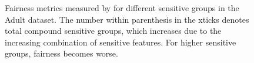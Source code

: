 \begin{figure}
	\centering
	\caption[Fairness verification on compound sensitive groups]{Fairness metrics measured by {\justicia} for different sensitive groups in the Adult dataset. The number within parenthesis in the xticks denotes total compound sensitive groups, which increases due to the increasing combination of sensitive features. For higher sensitive groups, fairness becomes worse.}
	\label{fairness_justicia_fig:sensitive_groups}
\end{figure}



